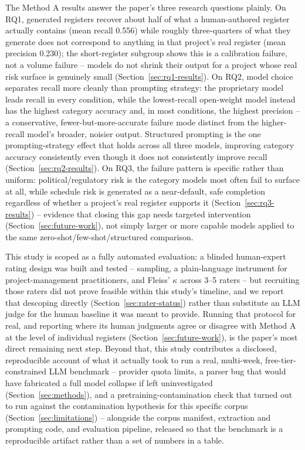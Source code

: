 \documentclass[conference]{IEEEtran}
\begin{document}
The Method A results answer the paper's three research questions plainly.
On RQ1, generated registers recover about half of what a human-authored
register actually contains (mean recall 0.556) while roughly three-quarters
of what they generate does not correspond to anything in that project's
real register (mean precision 0.230); the short-register subgroup shows
this is a calibration failure, not a volume failure -- models do not shrink
their output for a project whose real risk surface is genuinely small
(Section~\ref{sec:rq1-results}). On RQ2, model choice separates recall more
cleanly than prompting strategy: the proprietary model leads recall in
every condition, while the lowest-recall open-weight model instead has the
highest category accuracy and, in most conditions, the highest precision --
a conservative, fewer-but-more-accurate failure mode distinct from the
higher-recall model's broader, noisier output. Structured prompting is the
one prompting-strategy effect that holds across all three models, improving
category accuracy consistently even though it does not consistently improve
recall (Section~\ref{sec:rq2-results}). On RQ3, the failure pattern is
specific rather than uniform: political/regulatory risk is the category
models most often fail to surface at all, while schedule risk is generated
as a near-default, safe completion regardless of whether a project's real
register supports it (Section~\ref{sec:rq3-results}) -- evidence that
closing this gap needs targeted intervention (Section~\ref{sec:future-work}),
not simply larger or more capable models applied to the same
zero-shot/few-shot/structured comparison.

This study is scoped as a fully automated evaluation: a blinded
human-expert rating design was built and tested -- sampling, a
plain-language instrument for project-management practitioners, and
Fleiss' $\kappa$ across 3--5 raters -- but recruiting those raters did not
prove feasible within this study's timeline, and we report that descoping
directly (Section~\ref{sec:rater-status}) rather than substitute an LLM
judge for the human baseline it was meant to provide. Running that
protocol for real, and reporting where its human judgments agree or
disagree with Method A at the level of individual registers
(Section~\ref{sec:future-work}), is the paper's most direct remaining next
step. Beyond that, this study contributes a disclosed, reproducible account
of what it actually took to run a real, multi-week, free-tier-constrained
LLM benchmark -- provider quota limits, a parser bug that would have
fabricated a full model collapse if left uninvestigated
(Section~\ref{sec:methods}), and a pretraining-contamination check that
turned out to run against the contamination hypothesis for this specific
corpus (Section~\ref{sec:limitations}) -- alongside the corpus manifest,
extraction and prompting code, and evaluation pipeline, released so that
the benchmark is a reproducible artifact rather than a set of numbers in a
table.



\end{document}
